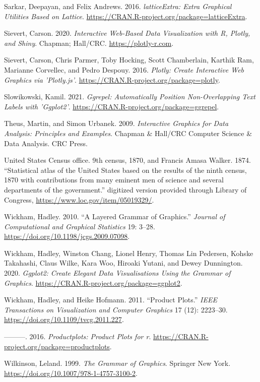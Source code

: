 \begin{CSLReferences}{1}{0}
\leavevmode{}%
Sarkar, Deepayan, and Felix Andrews. 2016. \emph{{latticeExtra: Extra Graphical Utilities Based on Lattice}}. \url{https://CRAN.R-project.org/package=latticeExtra}.

\leavevmode{}%
Sievert, Carson. 2020. \emph{Interactive Web-Based Data Visualization with {R}, Plotly, and Shiny}. Chapman; Hall/CRC. \url{https://plotly-r.com}.

\leavevmode{}%
Sievert, Carson, Chris Parmer, Toby Hocking, Scott Chamberlain, Karthik Ram, Marianne Corvellec, and Pedro Despouy. 2016. \emph{Plotly: Create Interactive Web Graphics via 'Plotly.js'}. \url{https://CRAN.R-project.org/package=plotly}.

\leavevmode{}%
Slowikowski, Kamil. 2021. \emph{Ggrepel: Automatically Position Non-Overlapping Text Labels with 'Ggplot2'}. \url{https://CRAN.R-project.org/package=ggrepel}.

\leavevmode{}%
Theus, Martin, and Simon Urbanek. 2009. \emph{Interactive Graphics for Data Analysis: Principles and Examples}. Chapman \& Hall/CRC Computer Science \& Data Analysis. CRC Press.

\leavevmode{}%
United States Census office. 9th census, 1870, and Francis Amasa Walker. 1874. {``{Statistical atlas of the United States based on the results of the ninth census, 1870 with contributions from many eminent men of science and several departments of the government}.''} digitized version provided through Library of Congress, \url{https://www.loc.gov/item/05019329/}.

\leavevmode{}%
Wickham, Hadley. 2010. {``A Layered Grammar of Graphics.''} \emph{Journal of Computational and Graphical Statistics} 19: 3--28. \url{https://doi.org/10.1198/jcgs.2009.07098}.

\leavevmode{}%
Wickham, Hadley, Winston Chang, Lionel Henry, Thomas Lin Pedersen, Kohske Takahashi, Claus Wilke, Kara Woo, Hiroaki Yutani, and Dewey Dunnington. 2020. \emph{Ggplot2: Create Elegant Data Visualisations Using the Grammar of Graphics}. \url{https://CRAN.R-project.org/package=ggplot2}.

\leavevmode{}%
Wickham, Hadley, and Heike Hofmann. 2011. {``Product Plots.''} \emph{IEEE Transactions on Visualization and Computer Graphics} 17 (12): 2223--30. \url{https://doi.org/10.1109/tvcg.2011.227}.

\leavevmode{}%
---------. 2016. \emph{Productplots: Product Plots for r}. \url{https://CRAN.R-project.org/package=productplots}.

\leavevmode{}%
Wilkinson, Leland. 1999. \emph{The Grammar of Graphics}. Springer New York. \url{https://doi.org/10.1007/978-1-4757-3100-2}.

\end{CSLReferences}

